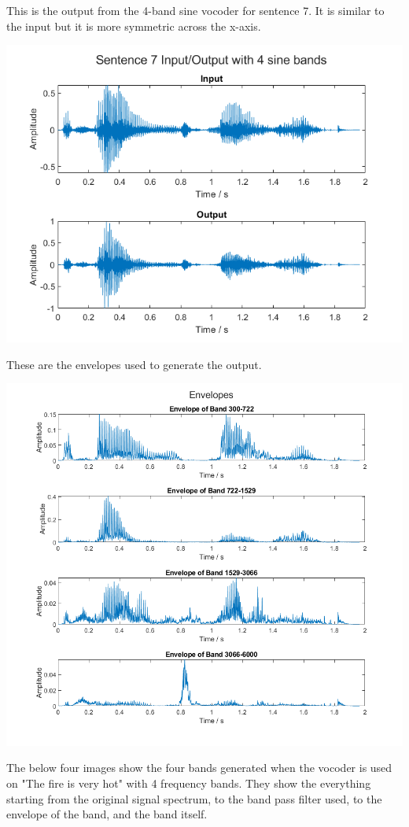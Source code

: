 \documentclass[11pt]{article}
\begin{document}
This is the output from the 4-band sine vocoder for sentence 7.
It is similar to the input but it is more symmetric across the x-axis.

\includegraphics[width=\textwidth]{output/IO_4sine.png}

These are the envelopes used to generate the output.

\includegraphics[width=\textwidth]{output/sent007_envelopes.png}

The below four images show the four bands generated when the vocoder
is used on "The fire is very hot" with 4 frequency bands.
They show the everything starting from the original signal 
spectrum, to the band pass filter used, to the envelope of the band,
and the band itself.\\
\end{document}
